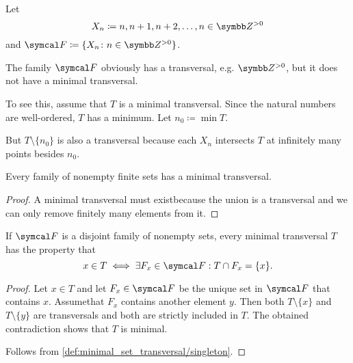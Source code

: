 \begin{example}\label{ex:no_minimal_set_transversal}\cite[90]{Lectures:logic_programming}
  Let
  \begin{equation*}
    X_n \coloneqq n, n + 1, n + 2, \ldots, n \in \Z^{>0}
  \end{equation*}
  and \( \Cal{F} \coloneqq \{ X_n \colon n \in \Z^{>0} \} \).

  The family \( \Cal{F} \) obviously has a transversal, e.g. \( \Z^{>0} \), but it does not have a minimal transversal.

  To see this, assume that \( T \) is a minimal transversal. Since the natural numbers are well-ordered, \( T \) has a minimum. Let \( n_0 \coloneqq \min T \).

  But \( T \setminus \{ n_0 \} \) is also a transversal because each \( X_n \) intersects \( T \) at infinitely many points besides \( n_0 \).
\end{example}

\begin{proposition}\label{thm:finite_minimal_set_transversal}\cite[91]{Lectures:logic_programming}
  Every family of nonempty finite sets has a minimal transversal.
\end{proposition}
\begin{proof}
  A minimal transversal must exist\LEM because the union is a transversal and we can only remove finitely many elements from it.
\end{proof}

\begin{proposition}\label{thm:disjoint_minimal_set_transversal}
  If \( \Cal{F} \) is a disjoint family of nonempty sets, every minimal transversal \( T \) has the property that
  \begin{equation*}
    x \in T \iff \exists F_x \in \Cal{F}: T \cap F_x = \{ x \}.
  \end{equation*}
\end{proposition}
\begin{proof}
  \Implies Let \( x \in T \) and let \( F_x \in \Cal{F} \) be the unique set in \( \Cal{F} \) that contains \( x \). Assume\LEM that \( F_x \) contains another element \( y \). Then both \( T \setminus \{ x \} \) and \( T \setminus \{ y \} \) are transversals and both are strictly included in \( T \). The obtained contradiction shows that \( T \) is minimal.

  \ImpliedBy Follows from \cref{def:minimal_set_transversal/singleton}.
\end{proof}
